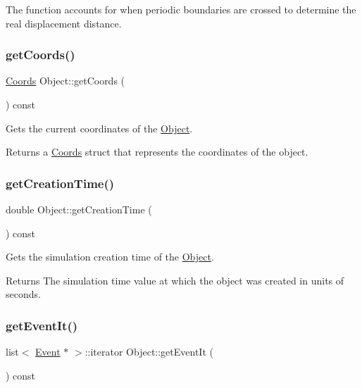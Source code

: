 The function accounts for when periodic boundaries are crossed to determine the real displacement distance. \mbox{\label{class_object_a08df08943dc634609fa69b356a37d73f}} 
\subsubsection{\texorpdfstring{get\+Coords()}{getCoords()}}
{\footnotesize\ttfamily \hyperlink{struct_coords}{Coords} Object\+::get\+Coords (\begin{DoxyParamCaption}{ }\end{DoxyParamCaption}) const}



Gets the current coordinates of the \hyperlink{class_object}{Object}. 

\begin{DoxyReturn}{Returns}
a \hyperlink{struct_coords}{Coords} struct that represents the coordinates of the object. 
\end{DoxyReturn}
\mbox{\label{class_object_a6f91c3f8b61cb9c9a8db662ac07d92e9}} 
\subsubsection{\texorpdfstring{get\+Creation\+Time()}{getCreationTime()}}
{\footnotesize\ttfamily double Object\+::get\+Creation\+Time (\begin{DoxyParamCaption}{ }\end{DoxyParamCaption}) const}



Gets the simulation creation time of the \hyperlink{class_object}{Object}. 

\begin{DoxyReturn}{Returns}
The simulation time value at which the object was created in units of seconds. 
\end{DoxyReturn}
\mbox{\label{class_object_aa7c58e0319b7715c8d36f38ca7acf03e}} 
\subsubsection{\texorpdfstring{get\+Event\+It()}{getEventIt()}}
{\footnotesize\ttfamily list$<$ \hyperlink{class_event}{Event} $\ast$ $>$\+::iterator Object\+::get\+Event\+It (\begin{DoxyParamCaption}{ }\end{DoxyParamCaption}) const}



